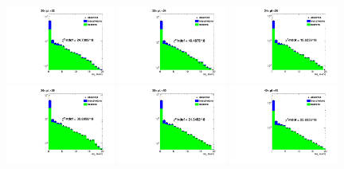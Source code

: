 \documentclass[thesis.tex]{subfiles}
\renewcommand\_{\textunderscore\allowbreak}
\begin{document}
\begin{figure}[hbtp]
  \centering
    \includegraphics[width=0.32\textwidth]{Figures/frac-30-32_ChIso-DoubleEG-ReMiniAOD.pdf}   \includegraphics[width=0.32\textwidth]{Figures/frac-32-34_ChIso-DoubleEG-ReMiniAOD.pdf}         \includegraphics[width=0.32\textwidth]{Figures/frac-34-36_ChIso-DoubleEG-ReMiniAOD.pdf} \\
       \includegraphics[width=0.32\textwidth]{Figures/frac-36-38_ChIso-DoubleEG-ReMiniAOD.pdf}   \includegraphics[width=0.32\textwidth]{Figures/frac-38-40_ChIso-DoubleEG-ReMiniAOD.pdf}         \includegraphics[width=0.32\textwidth]{Figures/frac-40-45_ChIso-DoubleEG-ReMiniAOD.pdf} \\

\end{figure}
\end{document}
